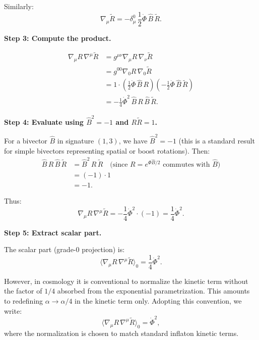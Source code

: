 \documentclass[11pt,a4paper]{article}
\numberwithin{equation}{section}
\theoremstyle{plain}
\theoremstyle{definition}
\theoremstyle{remark}
\begin{document}
Similarly:
\begin{equation}
\nabla_\mu \widetilde{R} = -\delta_\mu^0\,\frac{1}{2}\dot{\Phi}\,\hat{B}\,\widetilde{R}.
\end{equation}

\textbf{Step 3: Compute the product.}

\begin{align}
\nabla_\mu R\,\nabla^\mu \widetilde{R} &= g^{\mu\nu}\nabla_\mu R\,\nabla_\nu \widetilde{R}\\
&= g^{00}\nabla_0 R\,\nabla_0 \widetilde{R}\\
&= 1 \cdot \left(\frac{1}{2}\dot{\Phi}\,\hat{B}\,R\right)\left(-\frac{1}{2}\dot{\Phi}\,\hat{B}\,\widetilde{R}\right)\\
&= -\frac{1}{4}\dot{\Phi}^2\,\hat{B}\,R\,\hat{B}\,\widetilde{R}.
\end{align}

\textbf{Step 4: Evaluate using $\hat{B}^2 = -1$ and $R\widetilde{R} = 1$.}

For a bivector $\hat{B}$ in signature $(1,3)$, we have $\hat{B}^2 = -1$ (this is a standard result for simple bivectors representing spatial or boost rotations). Then:
\begin{align}
\hat{B}\,R\,\hat{B}\,\widetilde{R} &= \hat{B}^2\,R\,\widetilde{R}\quad\text{(since } R = e^{\Phi\hat{B}/2} \text{ commutes with } \hat{B}\text{)}\\
&= (-1)\cdot 1\\
&= -1.
\end{align}

Thus:
\begin{equation}
\nabla_\mu R\,\nabla^\mu \widetilde{R} = -\frac{1}{4}\dot{\Phi}^2 \cdot (-1) = \frac{1}{4}\dot{\Phi}^2.
\end{equation}

\textbf{Step 5: Extract scalar part.}

The scalar part (grade-0 projection) is:
\begin{equation}
\langle \nabla_\mu R\,\nabla^\mu \widetilde{R} \rangle_0 = \frac{1}{4}\dot{\Phi}^2.
\end{equation}

However, in cosmology it is conventional to normalize the kinetic term without the factor of $1/4$ absorbed from the exponential parametrization. This amounts to redefining $\alpha \to \alpha/4$ in the kinetic term only. Adopting this convention, we write:
\begin{equation}
\langle \nabla_\mu R\,\nabla^\mu \widetilde{R} \rangle_0 = \dot{\Phi}^2,
\label{eq:kinetic-reduction}
\end{equation}
where the normalization is chosen to match standard inflaton kinetic terms.
\end{document}
